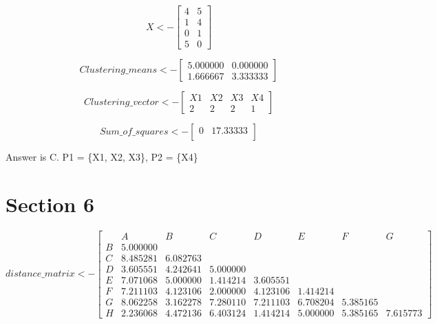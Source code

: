 \documentclass{report}
\begin{document}
\[
  X <- 
  \begin{bmatrix}
    4 & 5 \\
    1 & 4 \\
    0 & 1 \\
    5 & 0
  \end{bmatrix}
\]

\[
  Clustering\_means <- 
  \begin{bmatrix}
    5.000000 & 0.000000 \\
    1.666667 & 3.333333
  \end{bmatrix}
\]

\[
  Clustering\_vector <- 
  \begin{bmatrix}
    X1 & X2 & X3 & X4 \\
    2 & 2 & 2 & 1
  \end{bmatrix}
\]

\[
  Sum\_of\_squares <- 
  \begin{bmatrix}
    0 & 17.33333 \\
  \end{bmatrix}
\]

Answer is C. P1 = \{X1, X2, X3\}, P2 = \{X4\}



\chapter{Section 6}

\[
  distance\_matrix <- 
  \begin{bmatrix}
      & A        & B        & C        & D        & E        & F        & G        \\
    B & 5.000000 &          &          &          &          &          &          \\
    C & 8.485281 & 6.082763 &          &          &          &          &          \\
    D & 3.605551 & 4.242641 & 5.000000 &          &          &          &          \\
    E & 7.071068 & 5.000000 & 1.414214 & 3.605551 &          &          &          \\
    F & 7.211103 & 4.123106 & 2.000000 & 4.123106 & 1.414214 &          &          \\
    G & 8.062258 & 3.162278 & 7.280110 & 7.211103 & 6.708204 & 5.385165 &          \\
    H & 2.236068 & 4.472136 & 6.403124 & 1.414214 & 5.000000 & 5.385165 & 7.615773
  \end{bmatrix}
\]
\end{document}
